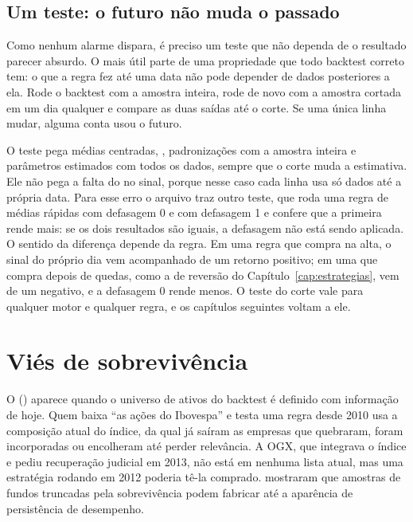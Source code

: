 \subsection{Um teste: o futuro não muda o passado}
\label{sec:c10-teste-futuro}

Como nenhum alarme dispara, é preciso um teste que não dependa de o resultado parecer absurdo. O mais útil parte de uma propriedade que todo backtest correto tem: o que a regra fez até uma data não pode depender de dados posteriores a ela. Rode o backtest com a amostra inteira, rode de novo com a amostra cortada em um dia qualquer e compare as duas saídas até o corte. Se uma única linha mudar, alguma conta usou o futuro.



O teste pega médias centradas, , padronizações com a amostra inteira e parâmetros estimados com todos os dados, sempre que o corte muda a estimativa. Ele não pega a falta do  no sinal, porque nesse caso cada linha usa só dados até a própria data. Para esse erro o arquivo traz outro teste, que roda uma regra de médias rápidas com defasagem 0 e com defasagem 1 e confere que a primeira rende mais: se os dois resultados são iguais, a defasagem não está sendo aplicada. O sentido da diferença depende da regra. Em uma regra que compra na alta, o sinal do próprio dia vem acompanhado de um retorno positivo; em uma que compra depois de quedas, como a de reversão do Capítulo~\ref{cap:estrategias}, vem de um negativo, e a defasagem 0 rende menos. O teste do corte vale para qualquer motor e qualquer regra, e os capítulos seguintes voltam a ele.

\section{Viés de sobrevivência}
\label{sec:c10-sobrevivencia}

O  () aparece quando o universo de ativos do backtest é definido com informação de hoje. Quem baixa ``as ações do Ibovespa'' e testa uma regra desde 2010 usa a composição atual do índice, da qual já saíram as empresas que quebraram, foram incorporadas ou encolheram até perder relevância. A OGX, que integrava o índice e pediu recuperação judicial em 2013, não está em nenhuma lista atual, mas uma estratégia rodando em 2012 poderia tê-la comprado. \citet{brown1992} mostraram que amostras de fundos truncadas pela sobrevivência podem fabricar até a aparência de persistência de desempenho.

